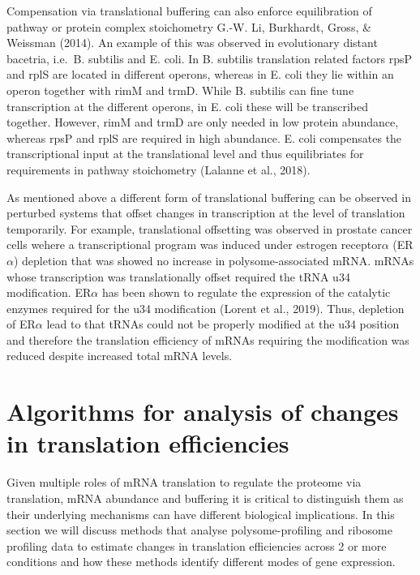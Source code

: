 \documentclass[
  12pt,
  openany]{book}
\begin{document}
Compensation via translational buffering can also enforce equilibration of pathway or protein complex stoichometry G.-W. Li, Burkhardt, Gross, \& Weissman (2014). An example of this was observed in evolutionary distant bacetria, i.e.~B. subtilis and E. coli. In B. subtilis translation related factors rpsP and rplS are located in different operons, whereas in E. coli they lie within an operon together with rimM and trmD. While B. subtilis can fine tune transcription at the different operons, in E. coli these will be transcribed together. However, rimM and trmD are only needed in low protein abundance, whereas rpsP and rplS are required in high abundance. E. coli compensates the transcriptional input at the translational level and thus equilibriates for requirements in pathway stoichometry (Lalanne et al., 2018).

As mentioned above a different form of translational buffering can be observed in perturbed systems that offset changes in transcription at the level of translation temporarily. For example, translational offsetting was observed in prostate cancer cells wehere a transcriptional program was induced under estrogen receptor\(\alpha\) (ER\(\alpha\)) depletion that was showed no increase in polysome-associated mRNA. mRNAs whose transcription was translationally offset required the tRNA u34 modification. ER\(\alpha\) has been shown to regulate the expression of the catalytic enzymes required for the u34 modification (Lorent et al., 2019). Thus, depletion of ER\(\alpha\) lead to that tRNAs could not be properly modified at the u34 position and therefore the translation efficiency of mRNAs requiring the modification was reduced despite increased total mRNA levels.
\newline

\section{Algorithms for analysis of changes in translation efficiencies}\label{algorithm}

Given multiple roles of mRNA translation to regulate the proteome via translation, mRNA abundance and buffering it is critical to distinguish them as their underlying mechanisms can have different biological implications. In this section we will discuss methods that analyse polysome-profiling and ribosome profiling data to estimate changes in translation efficiencies across 2 or more conditions and how these methods identify different modes of gene expression.
\end{document}
